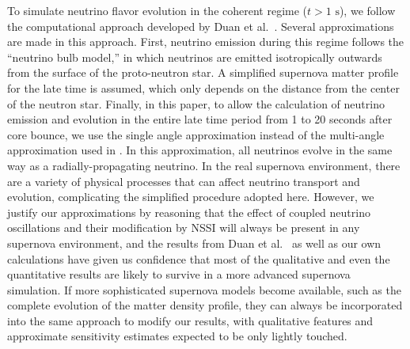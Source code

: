 \documentclass[a4paper,12pt]{article}
\begin{document}
To simulate neutrino flavor evolution in the coherent regime ($t > 1\text{ s}$), we follow the computational approach developed by Duan et al.\ \cite{Duan:2008eb}. Several approximations are made in this approach. First, neutrino emission during this regime follows the ``neutrino bulb model,'' in which neutrinos are emitted isotropically outwards from the surface of the proto-neutron star. A simplified supernova matter profile for the late time is assumed, which only depends on the distance from the center of the neutron star. Finally, in this paper, to allow the calculation of neutrino emission and evolution in the entire late time period from 1 to 20 seconds after core bounce, we use the single angle approximation instead of the multi-angle approximation used in \cite{Duan:2008eb}. In this approximation, all neutrinos evolve in the same way as a radially-propagating neutrino. In the real supernova environment, there are a variety of physical processes that can affect neutrino transport and evolution, complicating the simplified procedure adopted here. However, we justify our approximations by reasoning that the effect of coupled neutrino oscillations and their modification by NSSI will always be present in any supernova environment, and the results from Duan et al.\ \cite{Duan:2006an,Duan:2008eb} as well as our own calculations have given us confidence that most of the qualitative and even the quantitative results are likely to survive in a more advanced supernova simulation. If more sophisticated supernova models become available, such as the complete evolution of the matter density profile, they can always be incorporated into the same approach to modify our results, with qualitative features and approximate sensitivity estimates expected to be only lightly touched.
\end{document}
